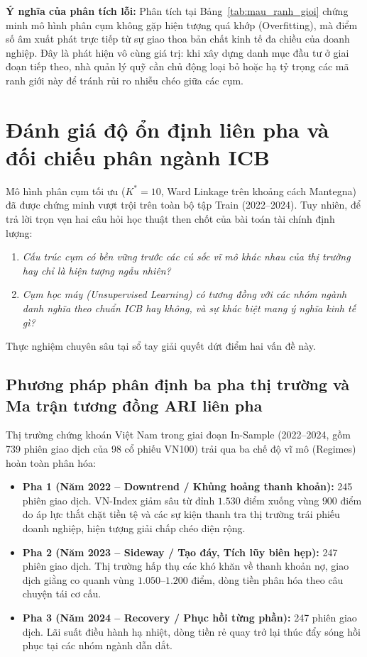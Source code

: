 \documentclass[12pt,a4paper,oneside,openany]{report}
\begin{document}
\textbf{Ý nghĩa của phân tích lỗi:}  
Phân tích tại Bảng~\ref{tab:mau_ranh_gioi} chứng minh mô hình phân cụm không gặp hiện tượng quá khớp (Overfitting), mà điểm số âm xuất phát trực tiếp từ sự giao thoa bản chất kinh tế đa chiều của doanh nghiệp. Đây là phát hiện vô cùng giá trị: khi xây dựng danh mục đầu tư ở giai đoạn tiếp theo, nhà quản lý quỹ cần chủ động loại bỏ hoặc hạ tỷ trọng các mã ranh giới này để tránh rủi ro nhiễu chéo giữa các cụm.

\chapter{Đánh giá độ ổn định liên pha và đối chiếu phân ngành ICB}
\label{chap:danhgia_on_dinh_icb}

Mô hình phân cụm tối ưu ($K^* = 10$, Ward Linkage trên khoảng cách Mantegna) đã được chứng minh vượt trội trên toàn bộ tập Train (2022--2024). Tuy nhiên, để trả lời trọn vẹn hai câu hỏi học thuật then chốt của bài toán tài chính định lượng:
\begin{enumerate}
  \item \textit{Cấu trúc cụm có bền vững trước các cú sốc vĩ mô khác nhau của thị trường hay chỉ là hiện tượng ngẫu nhiên?}
  \item \textit{Cụm học máy (Unsupervised Learning) có tương đồng với các nhóm ngành danh nghĩa theo chuẩn ICB hay không, và sự khác biệt mang ý nghĩa kinh tế gì?}
\end{enumerate}
Thực nghiệm chuyên sâu tại sổ tay  giải quyết dứt điểm hai vấn đề này.

\section{Phương pháp phân định ba pha thị trường và Ma trận tương đồng ARI liên pha}
\label{sec:on_dinh_lien_pha}

Thị trường chứng khoán Việt Nam trong giai đoạn In-Sample (2022--2024, gồm 739 phiên giao dịch của 98 cổ phiếu VN100) trải qua ba chế độ vĩ mô (Regimes) hoàn toàn phân hóa:
\begin{itemize}
  \item \textbf{Pha 1 (Năm 2022 -- Downtrend / Khủng hoảng thanh khoản):} 245 phiên giao dịch. VN-Index giảm sâu từ đỉnh $1.530$ điểm xuống vùng $900$ điểm do áp lực thắt chặt tiền tệ và các sự kiện thanh tra thị trường trái phiếu doanh nghiệp, hiện tượng giải chấp chéo diện rộng.
  \item \textbf{Pha 2 (Năm 2023 -- Sideway / Tạo đáy, Tích lũy biên hẹp):} 247 phiên giao dịch. Thị trường hấp thụ các khó khăn về thanh khoản nợ, giao dịch giằng co quanh vùng $1.050$--$1.200$ điểm, dòng tiền phân hóa theo câu chuyện tái cơ cấu.
  \item \textbf{Pha 3 (Năm 2024 -- Recovery / Phục hồi từng phần):} 247 phiên giao dịch. Lãi suất điều hành hạ nhiệt, dòng tiền rẻ quay trở lại thúc đẩy sóng hồi phục tại các nhóm ngành dẫn dắt.
\end{itemize}
\end{document}

